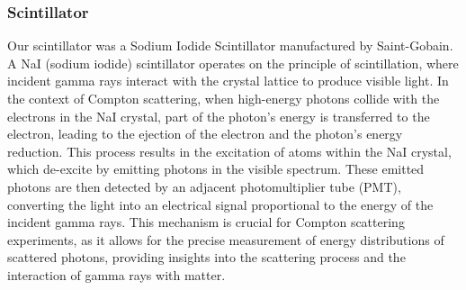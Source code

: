 \documentclass[10pt,letterpaper,onecolumn]{article}
\begin{document}
\subsubsection*{Scintillator}
Our scintillator was a Sodium Iodide Scintillator manufactured by Saint-Gobain. A NaI (sodium iodide) scintillator operates on the principle of scintillation, where incident gamma rays interact with the crystal lattice to produce visible light. In the context of Compton scattering, when high-energy photons collide with the electrons in the NaI crystal, part of the photon's energy is transferred to the electron, leading to the ejection of the electron and the photon's energy reduction. This process results in the excitation of atoms within the NaI crystal, which de-excite by emitting photons in the visible spectrum. These emitted photons are then detected by an adjacent photomultiplier tube (PMT), converting the light into an electrical signal proportional to the energy of the incident gamma rays. This mechanism is crucial for Compton scattering experiments, as it allows for the precise measurement of energy distributions of scattered photons, providing insights into the scattering process and the interaction of gamma rays with matter.
\end{document}
